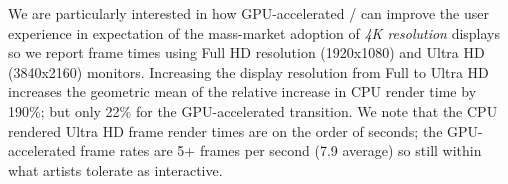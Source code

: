 We are particularly interested in how GPU-accelerated \Illustrator/
can improve the user experience in expectation of the mass-market
adoption of {\em 4K resolution} displays so we report frame times
using Full HD resolution (1920x1080) and Ultra HD (3840x2160) monitors.
Increasing the display resolution from Full to Ultra HD increases the
geometric mean of the relative increase in CPU render time by 190\%;
but only 22\% for the GPU-accelerated transition.  We note that the
CPU rendered Ultra HD frame render times are on the order of seconds;
the GPU-accelerated frame rates are 5+ frames per second (7.9 average)
so still within what artists tolerate as interactive.

%
%
%
%
%
%
%
%
%
%
%
%

